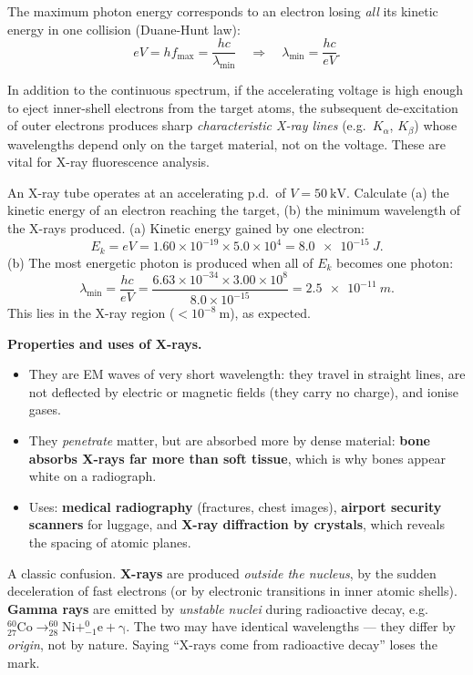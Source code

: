 \documentclass[11pt]{article}
\begin{document}
The maximum photon energy corresponds to an electron losing \emph{all} its kinetic energy in one collision (Duane-Hunt law):
\[ eV = hf_{\max} = \frac{hc}{\lambda_{\min}} \quad\Longrightarrow\quad \lambda_{\min} = \frac{hc}{eV}. \]

\begin{savaistu}
In addition to the continuous spectrum, if the accelerating voltage is high enough to eject inner-shell electrons from the target atoms, the subsequent de-excitation of outer electrons produces sharp \emph{characteristic X-ray lines} (e.g.\ $K_\alpha$, $K_\beta$) whose wavelengths depend only on the target material, not on the voltage. These are vital for X-ray fluorescence analysis.
\end{savaistu}

\begin{exoresolu}
An X-ray tube operates at an accelerating p.d.\ of $V = 50\ \mathrm{kV}$. Calculate (a) the kinetic energy of an electron reaching the target, (b) the minimum wavelength of the X-rays produced.
\tcblower
(a) Kinetic energy gained by one electron:
\[ E_k = eV = 1.60\times10^{-19}\times 5.0\times10^{4} = \SI{8.0e-15}{J}. \]
(b) The most energetic photon is produced when all of $E_k$ becomes one photon:
\[ \lambda_{\min} = \frac{hc}{eV} = \frac{6.63\times10^{-34}\times 3.00\times10^{8}}{8.0\times10^{-15}} = \SI{2.5e-11}{m}. \]
This lies in the X-ray region ($< 10^{-8}\ \mathrm{m}$), as expected.
\end{exoresolu}

\textbf{Properties and uses of X-rays.}
\begin{itemize}
\item They are EM waves of very short wavelength: they travel in straight lines, are not deflected by electric or magnetic fields (they carry no charge), and ionise gases.
\item They \emph{penetrate} matter, but are absorbed more by dense material: \textbf{bone absorbs X-rays far more than soft tissue}, which is why bones appear white on a radiograph.
\item Uses: \textbf{medical radiography} (fractures, chest images), \textbf{airport security scanners} for luggage, and \textbf{X-ray diffraction by crystals}, which reveals the spacing of atomic planes.
\end{itemize}

\begin{attention}
A classic confusion. \textbf{X-rays} are produced \emph{outside the nucleus}, by the sudden deceleration of fast electrons (or by electronic transitions in inner atomic shells). \textbf{Gamma rays} are emitted by \emph{unstable nuclei} during radioactive decay, e.g.\ \ensuremath{\mathrm{^{60}_{27}Co \rightarrow  ^{60}_{28}Ni + ^{0}_{-1}e + \gamma}}. The two may have identical wavelengths — they differ by \emph{origin}, not by nature. Saying ``X-rays come from radioactive decay'' loses the mark.
\end{attention}
\end{document}
